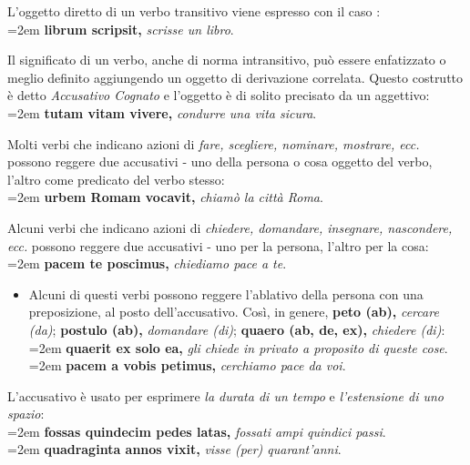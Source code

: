 \documentclass[nols]{tufte-handout}
\newcommand{\textls}[2][5]{%
    \begingroup\addfontfeatures{LetterSpace=#1}#2\endgroup
  }
\renewcommand{\smallcapsspacing}[1]{\textls[10]{#1}}
\renewcommand{\textsc}[1]{\smallcapsspacing{\textsmallcaps{#1}}}
\begin{document}
 L'oggetto diretto di un verbo transitivo viene espresso con il caso \textsc{Accusativo}: 
\\
\vspace{0.5em}
\hangindent=2em \textbf{librum scripsit,} \textit{scrisse un libro}. 

 Il significato di un verbo, anche di norma intransitivo, può essere enfatizzato o meglio definito aggiungendo un oggetto di derivazione correlata. Questo costrutto è detto \textit{Accusativo Cognato} e l'oggetto è di solito precisato da un aggettivo:
\\
\vspace{0.5em}
\hangindent=2em \textbf{tutam vitam vivere,} \textit{condurre una vita sicura}.

 Molti verbi che indicano azioni di \textit{fare, scegliere, nominare, mostrare, ecc.} possono reggere due accusativi - uno della persona o cosa oggetto del verbo, l'altro come predicato del verbo stesso:
\\
\vspace{0.5em}
\hangindent=2em \textbf{urbem Romam vocavit,} \textit{chiamò la città Roma}.
 
 Alcuni verbi che indicano azioni di \textit{chiedere, domandare, insegnare, nascondere, ecc.} possono reggere due accusativi - uno per la persona, l'altro per la cosa:
\\
\vspace{0.5em}
\hangindent=2em \textbf{pacem te poscimus,} \textit{chiediamo pace a te}.

\begin{itemize}
\item[\textsc{1.}] Alcuni di questi verbi possono reggere l'ablativo della persona con una preposizione, al posto dell'accusativo. Così, in genere, \textbf{peto (ab),} \textit{cercare (da)}; \textbf{postulo (ab),} \textit{domandare (di)}; \textbf{quaero (ab, de, ex),} \textit{chiedere (di)}:
\\
\vspace{0.5em}
\hangindent=2em \textbf{quaerit ex solo ea,} \textit{gli chiede in privato a proposito di queste cose}.\\
\hangindent=2em \textbf{pacem a vobis petimus,} \textit{cerchiamo pace da voi}.
\end{itemize}

 L'accusativo è usato per esprimere \textit{la durata di un tempo} e \textit{l'estensione di uno spazio}:
\\
\vspace{0.5em}
\hangindent=2em \textbf{fossas quindecim pedes latas,} \textit{fossati ampi quindici passi}.\\
\hangindent=2em \textbf{quadraginta annos vixit,} \textit{visse (per) quarant'anni}.
\end{document}

